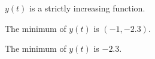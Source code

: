 \documentclass{ximera}
\begin{document}
\begin{exercise}
\begin{question}
$y(t)$ is a strictly increasing function.
\begin{multipleChoice}
\end{multipleChoice}

\end{question}




\begin{question} 



The minimum of $y(t)$ is $(-1, -2.3)$.
\begin{multipleChoice}
\end{multipleChoice}

\end{question}






\begin{question} 



The minimum of $y(t)$ is $-2.3$.
\begin{multipleChoice}
\end{multipleChoice}

\end{question}









\end{exercise}
\end{document}
